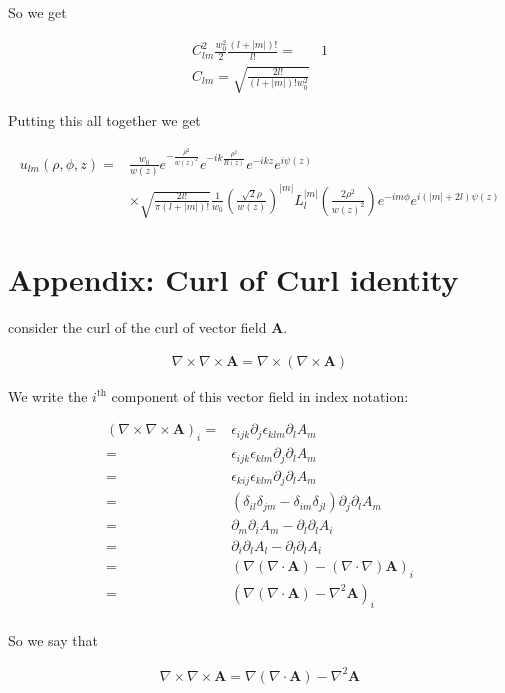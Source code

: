 \documentclass[12pt]{article}
\newcommand{\ep}{\epsilon}
\newcommand{\bv}[1]{\boldsymbol{#1}}
\begin{document}
So we get

\begin{align}
C_{lm}^2 \frac{w_0^2}{2} \frac{(l+|m|)!}{l!} =& 1\\
C_{lm} = \sqrt{\frac{2l!}{(l+|m|)! w_0^2}}
\end{align}

Putting this all together we get

\begin{align}
u_{lm}(\rho, \phi, z) =& \frac{w_0}{w(z)} e^{-\frac{\rho^2}{w(z)^2}} e^{-ik\frac{\rho^2}{R(z)}} e^{-ikz} e^{i\psi(z)}\\
& \times \sqrt{\frac{2l!}{\pi(l+|m|)!}}\frac{1}{w_0} \left(\frac{\sqrt{2}\rho}{w(z)}\right)^{|m|} L_l^{|m|}\left(\frac{2\rho^2}{w(z)^2}\right) e^{-im\phi} e^{i(|m|+2l)\psi(z)}
\end{align}

\section{Appendix: Curl of Curl identity}

consider the curl of the curl of vector field $\bv{A}$.

\begin{align}
\nabla \times \nabla \times \bv{A} = \nabla \times \left(\nabla \times \bv{A}\right)
\end{align}

We write the $i^{\text{th}}$ component of this vector field in index notation:

\begin{align}
\left(\nabla \times \nabla \times \bv{A}\right)_i =& \ep_{ijk} \partial_j \ep_{klm} \partial_l A_m\\
=& \ep_{ijk}\ep_{klm} \partial_j \partial_l A_m\\
=& \ep_{kij} \ep_{klm} \partial_j \partial_l A_m\\
=& \left( \delta_{il}\delta_{jm} - \delta_{im}\delta_{jl}\right)\partial_j \partial_l A_m\\
=& \partial_m \partial_i A_m - \partial_l \partial_l A_i\\
=& \partial_i \partial_l A_l - \partial_l \partial_l A_i\\
=& \left(\nabla \left(\nabla \cdot \bv{A}\right) - (\nabla\cdot \nabla) \bv{A}\right)_i\\
=&  \left(\nabla \left(\nabla \cdot \bv{A}\right) - \nabla^2 \bv{A}\right)_i\\
\end{align}

So we say that

\begin{align}
\nabla \times \nabla \times \bv{A} = \nabla\left(\nabla \cdot \bv{A}\right) - \nabla^2\bv{A}
\end{align}
\end{document}
